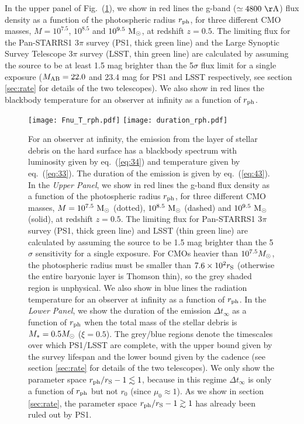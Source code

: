 \documentclass[useAMS,usenatbib]{mn2e}
\begin{document}
In the upper panel of Fig.~(\ref{fig:emission}),
we show in red lines the g-band ($\simeq 4800\rm\ \AA$) flux
density as a function of the photospheric radius $r_{\rm ph}$, for
three different  
CMO masses, $M = 10^{7.5}$, $10^{8.5}$ and $10^{9.5}\rm\ M_{\rm\odot}$, at
redshift $z=0.5$. The limiting flux for the Pan-STARRS1 3$\pi$ survey
(PS1, thick green line) and the Large Synoptic Survey Telescope 3$\pi$
survey (LSST, thin 
green line) are calculated by assuming the source to be at least 1.5
mag brighter than the 5$\sigma$ 
flux limit for a single exposure ($M_{\rm AB}=22.0$ and 23.4 mag for
PS1 and LSST 
respectively, see section \ref{sec:rate} for details of the two
telescopes). We also show in red lines the blackbody
temperature for an observer at infinity as a function of $r_{\rm ph}$. 

\begin{figure}
  \centering
\texttt{[image: Fnu\_T\_rph.pdf]}
\texttt{[image: duration\_rph.pdf]}
\caption{For an observer at infinity, the emission from the layer of
  stellar debris on the hard surface has a blackbody spectrum with
  luminosity given by eq.~(\ref{eq:34}) and temperature given by
  eq.~(\ref{eq:33}). The duration of the emission is given by
  eq.~(\ref{eq:43}). In the {\it Upper Panel}, we show in red lines
  the g-band flux density as a function of the photospheric radius
  $r_{\rm ph}$, for three different CMO masses, $M = 10^{7.5}\rm\
  M_{\rm\odot}$ (dotted), $10^{8.5} \rm\ M_{\rm\odot}$ (dashed)
  and $10^{9.5}\rm\ M_{\rm\odot}$ (solid), at redshift $z=0.5$. The
  limiting flux for Pan-STARRS1 3$\pi$ survey (PS1, thick green line)
  and LSST (thin green line) are calculated by assuming the source to
  be 1.5 mag brighter than the 5$\sigma$ sensitivity for a single 
  exposure. For CMOs heavier than
  $10^{7.5}M_{\rm \odot}$, the photospheric radius must be smaller
  than $7.6\times10^2r_{\rm S}$ (otherwise the entire baryonic layer
  is Thomson thin), so the grey shaded region is unphysical.
  We also show in blue lines the radiation temperature for an
  observer at infinity as a function of $r_{\rm ph}$. In the {\it
    Lower Panel}, we show 
  the duration of the emission $\Delta t_{\infty}$ as a function of
  $r_{\rm ph}$ when the total mass of the stellar debris is $M_* =
  0.5M_{\rm \odot}$ ($\xi = 0.5$). The grey/blue
  regions denote the timescales over which PS1/LSST are complete, with
  the upper bound given by the survey lifespan and the lower bound given
  by the cadence (see section \ref{sec:rate} for details of the two
  telescopes). We only show the parameter space $r_{\rm 
    ph}/r_{\rm S} - 1 \lesssim 1$, because in this regime $\Delta
  t_{\infty}$ is only a function of $r_{\rm ph}$ but not $r_0$ (since 
  $\mu_0\approx1$). As we show in section \ref{sec:rate}, the
  parameter space $r_{\rm ph}/r_{\rm S} - 1 \gtrsim1$ has already been
  ruled out by PS1.
}\label{fig:emission}
\end{figure}
\end{document}
